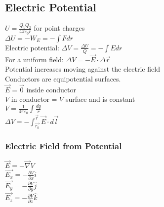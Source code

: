 \subsection*{Electric Potential}

$U = \frac{Q_1Q_2}{4\pi\varepsilon_0 r}$ for point charges\\
$\Delta U = -W_E = -\int Fdr$\\
Electric potential: $\Delta V = \frac{\Delta U}{Q} = -\int Edr$\\
For a uniform field: $\Delta V = -\vec{E}\cdot \Delta \vec{r}$\\
Potential increases moving against the
electric field\\
Conductors are equipotential surfaces.\\
$\vec{E} = \vec{0}$ inside conductor\\
$V$ in conductor = $V$ surface and is constant\\
$V = \frac{1}{4\pi \varepsilon_0} \int \frac{dq}{r}$\\
$\Delta V = - \int^{\vec{r}}_{\vec{r_0}} \vec{E} \cdot d \vec{l}$
\subsubsection*{Electric Field from Potential}
$\vec{E} = - \vec{\nabla}V$\\
$\vec{E_x} = - \frac{\partial V}{\partial x} \hat{i}$\\
$\vec{E_y} = - \frac{\partial V}{\partial y} \hat{j}$\\
$\vec{E_z} = - \frac{\partial V}{\partial z} \hat{k}$